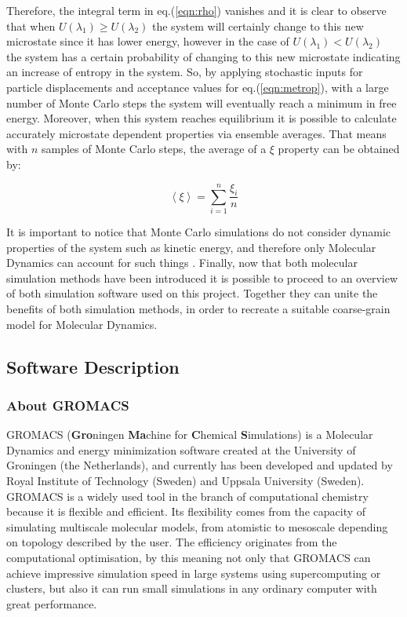 \documentclass[10pt,a4paper,twoside]{article}
\begin{document}
 Therefore, the integral term in eq.(\ref{eqn:rho}) vanishes and it is clear to observe that when $U(\lambda_1) \geqslant U(\lambda_2)$ the system will certainly change to this new microstate since it has lower energy, however in the case of $U(\lambda_1) < U(\lambda_2)$ the system has a certain probability of changing to this new microstate indicating an increase of entropy in the system. So, by applying stochastic inputs for particle displacements and acceptance values for eq.(\ref{eqn:metrop}), with a large number of Monte Carlo steps the system will eventually reach a minimum in free energy.
  Moreover, when this system reaches equilibrium it is possible to calculate accurately microstate dependent properties via ensemble averages. That means with $n$ samples of Monte Carlo steps, the average of a $ \xi $ property can be obtained by:
 
 \begin{equation}
\left\langle \xi\right\rangle  = \displaystyle \sum_{i=1}^{n} \dfrac{\xi_i}{n}
\label{eqn:average}
\end{equation}

It is important to notice that Monte Carlo simulations do not consider dynamic properties of the system such as kinetic energy, and therefore only Molecular Dynamics can account for such things \cite{satoh}. Finally, now that both molecular simulation methods have been introduced it is possible to proceed to an overview of both simulation software used on this project. Together they can unite the benefits of both simulation methods, in order to recreate a suitable coarse-grain model for Molecular Dynamics.
\subsection{Software Description}
\subsubsection{About GROMACS}

 GROMACS (\textbf{Gro}ningen \textbf{Ma}chine for \textbf{C}hemical \textbf{S}imulations) \cite{gromanual} is a Molecular Dynamics and energy minimization software created at the University of Groningen (the Netherlands), and currently has been developed and updated by Royal Institute of Technology (Sweden) and Uppsala University (Sweden). GROMACS is a widely used tool in the branch of computational chemistry because it is flexible and efficient. Its flexibility comes from the capacity of simulating multiscale molecular models, from atomistic to mesoscale depending on topology described by the user. The efficiency originates from the computational optimisation, by this meaning not only that GROMACS can achieve impressive simulation speed in large systems using supercomputing or clusters, but also it can run small simulations in any ordinary computer with great performance.
 
\end{document}
